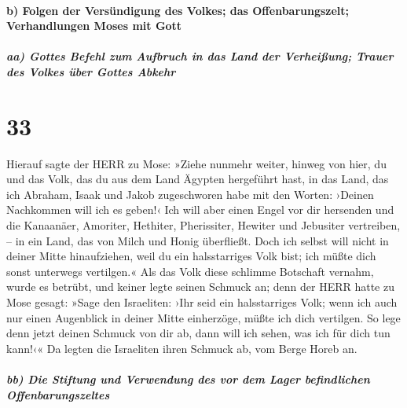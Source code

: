 \hypertarget{b-folgen-der-versuxfcndigung-des-volkes-das-offenbarungszelt-verhandlungen-moses-mit-gott}{%
\paragraph{b) Folgen der Versündigung des Volkes; das Offenbarungszelt;
Verhandlungen Moses mit
Gott}\label{b-folgen-der-versuxfcndigung-des-volkes-das-offenbarungszelt-verhandlungen-moses-mit-gott}}

\hypertarget{aa-gottes-befehl-zum-aufbruch-in-das-land-der-verheiuxdfung-trauer-des-volkes-uxfcber-gottes-abkehr}{%
\subparagraph{aa) Gottes Befehl zum Aufbruch in das Land der Verheißung;
Trauer des Volkes über Gottes
Abkehr}\label{aa-gottes-befehl-zum-aufbruch-in-das-land-der-verheiuxdfung-trauer-des-volkes-uxfcber-gottes-abkehr}}

\hypertarget{section-32}{%
\section{33}\label{section-32}}

 Hierauf sagte der HERR zu Mose: »Ziehe nunmehr weiter,
hinweg von hier, du und das Volk, das du aus dem Land Ägypten hergeführt
hast, in das Land, das ich Abraham, Isaak und Jakob zugeschworen habe
mit den Worten: ›Deinen Nachkommen will ich es geben!‹ 
Ich will aber einen Engel vor dir hersenden und die Kanaanäer, Amoriter,
Hethiter, Pherissiter, Hewiter und Jebusiter vertreiben, -- in ein Land,
das von Milch und Honig überfließt.  Doch ich selbst will
nicht in deiner Mitte hinaufziehen, weil du ein halsstarriges Volk bist;
ich müßte dich sonst unterwegs vertilgen.«  Als das Volk
diese schlimme Botschaft vernahm, wurde es betrübt, und keiner legte
seinen Schmuck an;  denn der HERR hatte zu Mose gesagt:
»Sage den Israeliten: ›Ihr seid ein halsstarriges Volk; wenn ich auch
nur einen Augenblick in deiner Mitte einherzöge, müßte ich dich
vertilgen. So lege denn jetzt deinen Schmuck von dir ab, dann will ich
sehen, was ich für dich tun kann!‹«  Da legten die
Israeliten ihren Schmuck ab, vom Berge Horeb an.

\hypertarget{bb-die-stiftung-und-verwendung-des-vor-dem-lager-befindlichen-offenbarungszeltes}{%
\subparagraph{bb) Die Stiftung und Verwendung des vor dem Lager
befindlichen
Offenbarungszeltes}\label{bb-die-stiftung-und-verwendung-des-vor-dem-lager-befindlichen-offenbarungszeltes}}

